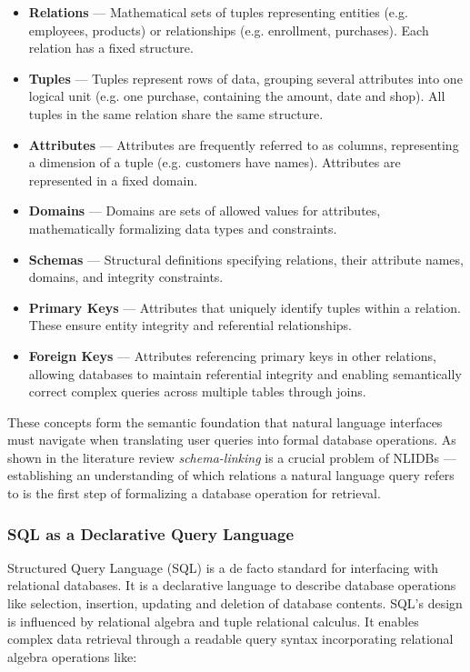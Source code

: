 \begin{itemize}
    \item \textbf{Relations} — Mathematical sets of tuples representing
        entities (e.g. employees, products) or relationships (e.g. enrollment,
        purchases). Each relation has a fixed structure.
    \item \textbf{Tuples} — Tuples represent rows of data, grouping several
        attributes into one logical unit (e.g. one purchase, containing the
        amount, date and shop). All tuples in the same relation share the same
        structure.
    \item \textbf{Attributes} — Attributes are frequently referred to as
        columns, representing a dimension of a tuple (e.g. customers have
        names). Attributes are represented in a fixed domain.
    \item \textbf{Domains} — Domains are sets of allowed values for attributes,
        mathematically formalizing data types and constraints.
    \item \textbf{Schemas} — Structural definitions specifying relations, their
        attribute names, domains, and integrity constraints.
    \item \textbf{Primary Keys} — Attributes that uniquely identify tuples
        within a relation. These ensure entity integrity and referential
        relationships.
    \item \textbf{Foreign Keys} — Attributes referencing primary keys in other
        relations, allowing databases to maintain referential integrity and
        enabling semantically correct complex queries across multiple tables
        through joins.
\end{itemize}

These concepts form the semantic foundation that natural language interfaces
must navigate when translating user queries into formal database operations. As
shown in the literature review \textit{schema-linking} is a crucial problem of
NLIDBs — establishing an understanding of which relations a natural language
query refers to is the first step of formalizing a database operation for
retrieval.

\subsubsection{SQL as a Declarative Query Language}

Structured Query Language (SQL) is a de facto standard for interfacing with
relational databases. It is a declarative language to describe database
operations like selection, insertion, updating and deletion of database
contents. SQL's design is influenced by relational algebra and tuple relational
calculus. It enables complex data retrieval through a readable query syntax
incorporating relational algebra operations like:


